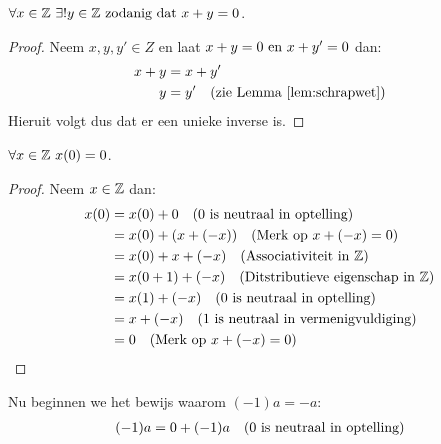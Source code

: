 \documentclass{article}
\begin{document}
\begin{enumerate}[label=\alph*)]
\begin{lemma}[Schrapwet]
          \end{lemma}
          \begin{lemma}\label{lem:unieke-inverse}
              \(\forall x \in \mathbb{Z} \ \exists ! y \in \mathbb{Z} \text{ zodanig dat } x + y = 0 \).
              \begin{proof}
                  Neem \(x, y, y' \in Z \) en laat \( x + y = 0 \text{ en } x + y' = 0\) dan:
                  \begin{align*}
                      x + y & = x + y'                                        \\
                      y     & = y' \quad (\text{zie Lemma \ref{lem:schrapwet}})
                  \end{align*}
                  Hieruit volgt dus dat er een unieke inverse is.
              \end{proof}
          \end{lemma}
          \begin{lemma}\label{lem:vermenigvuldiging-met-nul}
              \(\forall x \in \mathbb{Z} \ x(0) = 0 \).
              \begin{proof}
                  Neem $x \in \mathbb{Z}$ dan:
                  \begin{align*}
                      x(0) & = x(0) + 0 \quad (0 \text{ is neutraal in optelling})              \\
                           & = x(0) + (x + (-x)) \quad (\text{Merk op } x + (-x) = 0)           \\
                           & = x(0) + x + (-x) \quad (\text{Associativiteit in $\mathbb{Z}$})           \\
                           & = x(0 + 1) + (-x) \quad (\text{Ditstributieve eigenschap in $\mathbb{Z}$}) \\
                           & = x(1) + (-x) \quad (0 \text{ is neutraal in optelling})           \\
                           & = x + (-x) \quad (1 \text{ is neutraal in vermenigvuldiging})      \\
                           & = 0 \quad (\text{Merk op } x + (-x) = 0)
                  \end{align*}
              \end{proof}
          \end{lemma}
          Nu beginnen we het bewijs waarom $(-1)a = -a$:
          \begin{align*}
              (-1)a & = 0 + (-1)a \quad (0 \tx{ is neutraal in optelling})                              \\

\end{align*}
\end{enumerate}
\end{document}
